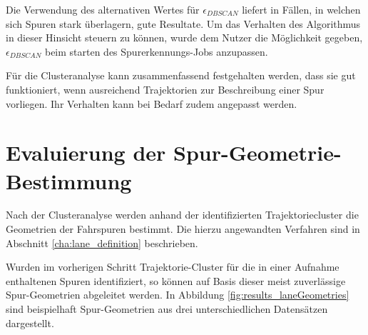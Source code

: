 Die Verwendung des alternativen Wertes für $\epsilon_{DBSCAN}$ liefert in Fällen, in welchen sich Spuren stark überlagern,
gute Resultate. Um das Verhalten des Algorithmus in dieser Hinsicht steuern zu können, wurde dem Nutzer die Möglichkeit
gegeben, $\epsilon_{DBSCAN}$ beim starten des Spurerkennungs-Jobs anzupassen.

Für die Clusteranalyse kann zusammenfassend festgehalten werden, dass sie gut funktioniert, wenn ausreichend Trajektorien
zur Beschreibung einer Spur vorliegen. Ihr Verhalten kann bei Bedarf zudem angepasst werden.

\section{Evaluierung der Spur-Geometrie-Bestimmung}

Nach der Clusteranalyse werden anhand der identifizierten Trajektoriecluster die Geometrien der Fahrspuren
bestimmt. Die hierzu angewandten Verfahren sind in Abschnitt \ref{cha:lane_definition} beschrieben.

Wurden im vorherigen Schritt Trajektorie-Cluster für die in einer Aufnahme enthaltenen Spuren identifiziert,
so können auf Basis dieser meist zuverlässige Spur-Geometrien abgeleitet werden.
In Abbildung \ref{fig:results_laneGeometries} sind beispielhaft Spur-Geometrien aus drei unterschiedlichen Datensätzen dargestellt.

